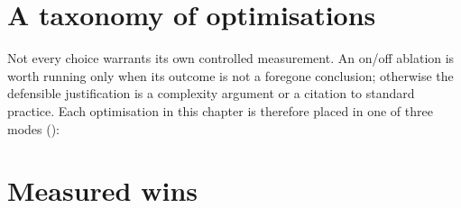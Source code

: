 \section{A taxonomy of optimisations}
\label{sec:four-modes}

Not every choice warrants its own controlled measurement. An on/off ablation is worth
running only when its outcome is not a foregone conclusion; otherwise the defensible justification is a
complexity argument or a citation to standard practice. Each optimisation in this chapter is therefore
placed in one of three modes ():

\begin{table}[htp]
  \centering
  \caption{The three justification modes: optimisations are measured when the outcome is
  uncertain, argued by complexity when it is bounded, and cited when they are standard practice.}
  \label{tab:four-modes}
\end{table}

\section{Measured wins}
\label{sec:wins}

